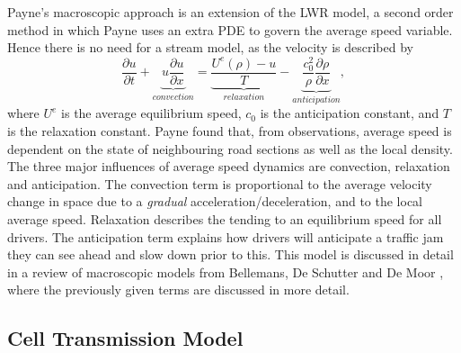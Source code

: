 	Payne's macroscopic approach \cite{Payne71} is an extension of the LWR model, a second order method in which Payne uses an extra PDE to govern the average speed variable. Hence there is no need for a stream model, as the velocity is described by
	\begin{equation}
		\frac{\partial u}{\partial t}+\underbrace{u\frac{\partial u}{\partial x}}_{convection}=\underbrace{\frac{U^e(\rho)-u}{T}}_{relaxation}-\underbrace{\frac{c_0^2}{\rho}\frac{\partial\rho}{\partial x}}_{anticipation},
	\end{equation}
	where $U^e$ is the average equilibrium speed, $c_0$ is the anticipation constant, and $T$ is the relaxation constant. Payne found that, from observations, average speed is dependent on the state of neighbouring road sections as well as the local density. The three major influences of average speed dynamics are convection, relaxation and anticipation. The convection term is proportional to the average velocity change in space due to a \emph{gradual} acceleration/deceleration, and to the local average speed. Relaxation describes the tending to an equilibrium speed for all drivers. The anticipation term explains how drivers will anticipate a traffic jam they can see ahead and slow down prior to this. This model is discussed in detail in a review of macroscopic models from Bellemans, De Schutter and De Moor \cite{Bellemans02}, where the previously given terms are discussed in more detail.

\subsection{Cell Transmission Model}

